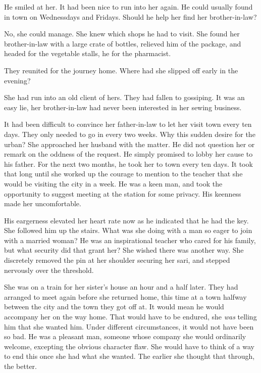 \documentclass{article}
\begin{document}
He smiled at her. It had been nice to run into her again. He could usually found in town on Wednessdays and Fridays. Should he help her find her brother-in-law?

No, she could manage. She knew which shops he had to visit. She found her brother-in-law with a large crate of bottles, relieved him of the package, and headed for the vegetable stalls, he for the pharmacist. 

They reunited for the journey home. Where had she slipped off early in the evening?

She had run into an old client of hers. They had fallen to gossiping. It was an easy lie, her brother-in-law had never been interested in her sewing business. 

It had been difficult to convince her father-in-law to let her visit town every ten days. They only needed to go in every two weeks. Why this sudden desire for the urban? She approached her husband with the matter. He did not question her or remark on the oddness of the request. He simply promised to lobby her cause to his father. For the next two months, he took her to town every ten days. It took that long until she worked up the courage to mention to the teacher that she would be visiting the city in a week. He was a keen man, and took the opportunity to suggest meeting at the station for some privacy. 
His keenness made her uncomfortable.  

His eargerness elevated her heart rate now as he indicated that he had the key. She followed him up the stairs. What was she doing with a man so eager to join with a married woman? He was an inspirational teacher who cared for his family, but what security did that grant her? She wished there was another way. She discretely removed the pin at her shoulder securing her sari, and stepped nervously over the threshold. 

She was on a train for her sister's house an hour and a half later. They had arranged to meet again before she returned home, this time at a town halfway between the city and the town they got off at. It would mean he would accompany her on the way home. That would have to be endured, she \emph{was} telling him that she wanted him. Under different circumstances, it would not have been so bad. He was a pleasant man, someone whose company she would ordinarily welcome, excepting the obvious character flaw. She would have to think of a way to end this once she had what she wanted. The earlier she thought that through, the better.
\end{document}
